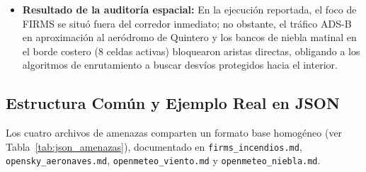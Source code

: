 \documentclass[letterpaper,12pt]{article}
\begin{document}
\begin{itemize}
    \item \textbf{Resultado de la auditoría espacial:} En la ejecución reportada, el foco de FIRMS se situó fuera del corredor inmediato; no obstante, el tráfico ADS-B en aproximación al aeródromo de Quintero y los bancos de niebla matinal en el borde costero ($8$ celdas activas) bloquearon aristas directas, obligando a los algoritmos de enrutamiento a buscar desvíos protegidos hacia el interior.
\end{itemize}

\subsection{Estructura Común y Ejemplo Real en JSON}
\label{subsec:json_amenazas}

Los cuatro archivos de amenazas comparten un formato base homogéneo (ver Tabla~\ref{tab:json_amenazas}), documentado en \texttt{firms\_incendios.md}, \texttt{opensky\_aeronaves.md}, \texttt{openmeteo\_viento.md} y \texttt{openmeteo\_niebla.md}.

\begin{table}[H]
\centering
\small
\caption{Estructura común de atributos en los archivos GeoJSON de amenazas.}
\label{tab:json_amenazas}
\end{table}
\end{document}
